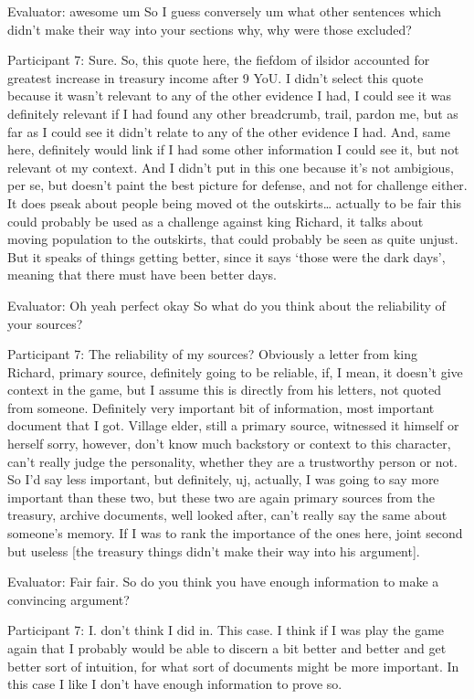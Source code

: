 \documentclass{l4proj}
\begin{document}
\begin{appendices}
Evaluator: awesome um So I guess conversely um what other sentences which didn't make their way into your sections why, why were those excluded?

Participant 7: Sure. So, this quote here, the fiefdom of ilsidor accounted for greatest increase in treasury income after 9 YoU. I didn’t select this quote because it wasn’t relevant to any of the other evidence I had, I could see it was definitely relevant if I had found any other breadcrumb, trail, pardon me, but as far as I could see it didn’t relate to any of the other evidence I had. And, same here, definitely would link if I had some other information I could see it, but not relevant ot my context. And I didn’t put in this one because it’s not ambigious, per se, but doesn’t paint the best picture for defense, and not for challenge either. It does pseak about people being moved ot the outskirts… actually to be fair this could probably be used as a challenge against king Richard, it talks about moving population to the outskirts, that could probably be seen as quite unjust. But it speaks of things getting better, since it says ‘those were the dark days’, meaning that there must have been better days. 

Evaluator: Oh yeah perfect okay So what do you think about the reliability of your sources? 

Participant 7: The reliability of my sources? Obviously a letter from king Richard, primary source, definitely going to be reliable, if, I mean, it doesn’t give context in the game, but I assume this is directly from his letters, not quoted from someone. Definitely very important bit of information, most important document that I got. Village elder, still a primary source, witnessed it himself or herself sorry, however, don’t know much backstory or context to this character, can’t really judge the personality, whether they are a trustworthy person or not. So I’d say less important, but definitely, uj, actually, I was going to say more important than these two, but these two are again primary sources from the treasury, archive documents, well looked after, can’t really say the same about someone’s memory. If I was to rank the importance of the ones here, joint second but useless [the treasury things didn’t make their way into his argument]. 

Evaluator: Fair fair. So do you think you have enough information to make a convincing argument?

Participant 7: I. don't think I did in. This case. I think if I was play the game again that I probably would be able to discern a bit better and better and get better sort of intuition, for what sort of documents might be more important. In this case I like I don't have enough information to prove so.


\end{appendices}
\end{document}
